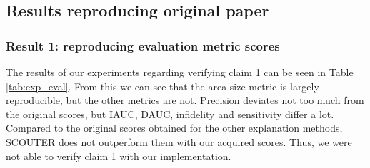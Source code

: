 \subsection{Results reproducing original paper}

\subsubsection{Result 1: reproducing evaluation metric scores}
The results of our experiments regarding verifying claim 1 can be seen in Table \ref{tab:exp_eval}. From this we can see that the area size metric is largely reproducible, but the other metrics are not. Precision deviates not too much from the original scores, but IAUC, DAUC, infidelity and sensitivity differ a lot. Compared to the original scores obtained for the other explanation methods, SCOUTER does not outperform them with our acquired scores. Thus, we were not able to verify claim 1 with our implementation.

